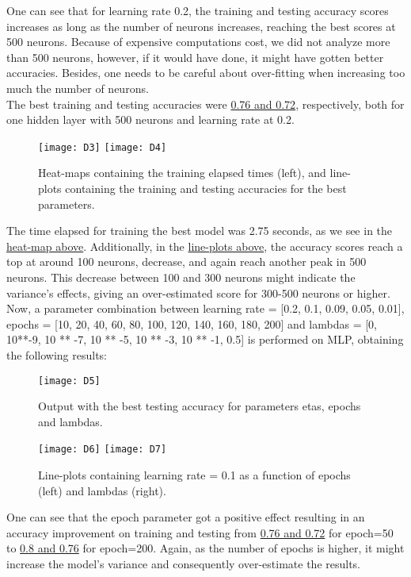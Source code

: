 One can see that for learning rate 0.2, the training and testing accuracy scores increases as long as the number of neurons increases, reaching the best scores at 500 neurons. Because of expensive computations cost, we did not analyze more than 500 neurons, however, if it would have done, it might have gotten better accuracies. Besides, one needs to be careful about over-fitting when increasing too much the number of neurons.\\

The best training and testing accuracies were \hyperref[fig:D1]{0.76 and 0.72}, respectively, both for one hidden layer with 500 neurons and learning rate at 0.2.

\begin{figure}[H]
\label{fig:D2}
\centering
\texttt{[image: D3]}
\texttt{[image: D4]}
\caption{Heat-maps containing the training elapsed times (left), and line-plots containing the training and testing accuracies for the best parameters.}
\end{figure}

The time elapsed for training the best model was 2.75 seconds, as we see in the \hyperref[fig:D2]{heat-map above}. Additionally, in the \hyperref[fig:D2]{line-plots above}, the accuracy scores reach a top at around 100 neurons, decrease, and again reach another peak in 500 neurons. This decrease between 100 and 300 neurons might indicate the variance's effects, giving an over-estimated score for 300-500 neurons or higher.\\

Now, a parameter combination between learning rate = [0.2, 0.1, 0.09, 0.05, 0.01], epochs = [10, 20, 40, 60, 80, 100, 120, 140, 160, 180, 200] and lambdas = [0, 10**-9, 10 ** -7, 10 ** -5, 10 ** -3, 10 ** -1, 0.5] is performed on MLP, obtaining the following results:

\begin{figure}[H]
\label{fig:D3}
\centering
\texttt{[image: D5]}
\caption{Output with the best testing accuracy for parameters etas, epochs and lambdas.}
\end{figure}

\begin{figure}[H]
\label{fig:D4}
\centering
\texttt{[image: D6]}
\texttt{[image: D7]}
\caption{Line-plots containing learning rate = 0.1 as a function of epochs (left) and lambdas (right).}
\end{figure}

One can see that the epoch parameter got a positive effect resulting in an accuracy improvement on training and testing from \hyperref[fig:D1]{0.76 and 0.72} for epoch=50 to \hyperref[fig:D4]{0.8 and 0.76} for epoch=200. Again, as the number of epochs is higher, it might increase the model's variance and consequently over-estimate the results.\\


